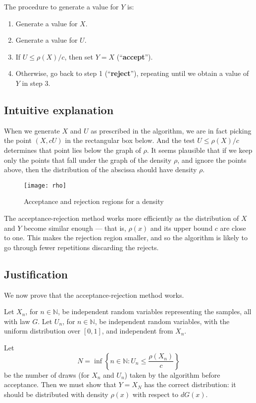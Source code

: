 \documentclass[12pt]{article}
\newcommand{\nat}{\mathbb{N}}
\begin{document}
The procedure to generate a value for $Y$ is:
\begin{enumerate}
\item
Generate a value for $X$.
\item
Generate a value for $U$.
\item
If $U \leq \rho(X)/c$, then set $Y = X$ (``\textbf{accept}'').
\item
Otherwise, go back to step 1 (``\textbf{reject}''),
repeating until we obtain a value of $Y$ in step 3.
\end{enumerate}

\subsection*{Intuitive explanation}

When we generate $X$ and $U$ as prescribed in the algorithm,
we are in fact picking the point $(X, cU)$ in the rectangular box
below.  And the test $U \leq \rho(X)/c$ determines
that point lies below the graph of $\rho$.
It seems plausible that if we keep only the points that
fall under the graph of the density $\rho$, and ignore the points above,
then the distribution of the abscissa
should have density $\rho$.

\begin{figure}[!htb]
\begin{center}
\texttt{[image: rho]}
\caption{Acceptance and rejection regions for a density}
\end{center}
\end{figure}

The acceptance-rejection method works more efficiently
as the distribution of $X$ and $Y$ become similar enough
--- that is, $\rho(x)$ and its upper bound $c$ are close to one.
This makes the rejection region smaller, and so the algorithm
is likely to go through fewer repetitions discarding the rejects.

\subsection*{Justification}

We now prove that the acceptance-rejection method works.

Let $X_n$, for $n \in \nat$, be independent  
random variables representing the samples, all with law $G$.
Let $U_n$, for $n \in \nat$, 
be independent random variables, with the uniform distribution over $[0,1]$,
and independent from $X_n$.

Let \[
N = \inf \left\{ n \in \nat \colon U_n \leq \frac{\rho(X_n)}{c} \right\}
\]
be the number of draws (for $X_n$ and $U_n$) taken by the algorithm
before acceptance.
Then we must show that $Y = X_N$ has the correct distribution:
it should be distributed with density $\rho(x)$ with respect to $dG(x)$.
\end{document}
